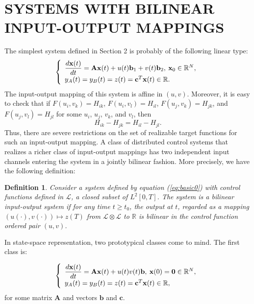 \documentclass[12pt,onecolumn,draftcls]{IEEEtran}
\newcommand{\RR}{\mathbb{R}}
\newcommand{\bb}{\mathbf{b}}
\newcommand{\bc}{\mathbf{c}}
\newcommand{\bA}{\mathbf{A}}
\newtheorem{definition}{Definition}[section]
\begin{document}
\section{SYSTEMS WITH BILINEAR INPUT-OUTPUT MAPPINGS}\setcounter{equation}{0}
The simplest system defined in Section 2 is probably of the following linear type:
\begin{equation}
\left\{
\begin{array}{l}
\dfrac{d\mathbf{x}(t)}{dt} = \mathbf{Ax}(t) + u(t)\mathbf{b}_1
+ v(t)\mathbf{b}_2,\:\mathbf{x}_0 \in \RR^N,
\vspace{0.05cm}\\
y_A(t) = y_B(t) = z(t) = \mathbf{c}^T \mathbf{x}(t) \in \mathbb{R}.
\end{array}
\right.
\end{equation}
The input-output mapping of this system is affine in $(u, v)$.
Moreover, it is easy to check that
if $F(u_i, v_k) = H_{ik}$,
$F(u_i, v_l) = H_{il}$, $F(u_j, v_k) = H_{jk}$, and
$F(u_j, v_l) = H_{jl}$ for some $u_i$, $u_j$, $v_k$, and $v_l$, then
\begin{equation}
H_{ik} - H_{jk} = H_{il} - H_{jl}.
\end{equation}
Thus, there are severe restrictions on the set of realizable target functions for such an input-output mapping.  
A class of distributed control systems that realizes a richer class of input-output mappings has two independent input channels entering the system in a jointly bilinear fashion.  More precisely, we have the following definition:
\begin{definition}
Consider a system defined by equation (\ref{eq:basic0}) with control functions
defined in $\mathcal{L}$, a closed subset of $L^2[0,T]$.  The system
is a {\em bilinear input-output system} if for any time $t \geq t_0$, the output at $t$, regarded as a mapping
$(u(\cdot ),v(\cdot ))\mapsto z(T)$ from
$\mathcal{L}\otimes\mathcal{L}$ to $\mathbb{R}$ is bilinear in the control function ordered pair $(u,v)$.
\end{definition}

In state-space representation, two prototypical classes come to mind.  The first class is:

\begin{equation}
\left\{
\begin{array}{l}
\dfrac{d\mathbf{x}(t)}{dt} = \mathbf{Ax}(t) + u(t)v(t)\mathbf{b},\:\mathbf{x}(0)=\mathbf{0} \in \RR^N,
\vspace{0.05cm}\\
y_A(t) = y_B(t) = z(t) = \mathbf{c}^T \mathbf{x}(t) \in \mathbb{R},
\end{array}
\right.
\label{eq:wong:GeneralBiLinear}
\end{equation}
for some matrix $\bA$ and vectors $\bb$ and $\bc$.
\end{document}
